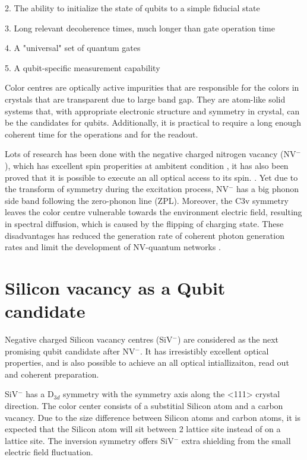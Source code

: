 2. The ability to initialize the state of qubits to a simple fiducial state

3. Long relevant decoherence times, much longer than gate operation time

4. A "universal" set of quantum gates

5. A qubit-specific measurement capability

Color centres are optically active impurities that are responsible for the colors in crystals that are transparent due to large band gap. They are atom-like solid systems that, with appropriate electronic structure and symmetry in crystal, can be the candidates for qubits. Additionally, it is practical to require a long enough coherent time for the operations and for the readout.  

Lots of research has been done with the negative charged nitrogen vacancy (NV$^{-}$), which has excellent spin properities at ambitent condition \citep{childress_atom-like_2014}, it has also been proved that it is possible to execute an all optical access to its spin. \citep{bassett_ultrafast_2014,buckley_spin-light_2010,santori_coherent_2006-1}. Yet due to the transform of symmetry during the excitation process, NV$^{-}$ has a big phonon side band following the zero-phonon line (ZPL). Moreover, the C3v symmetry leaves the color centre vulnerable towards the environment electric field, resulting in spectral diffusion, which is caused by the flipping of charging state. These disadvantages has reduced the generation rate of coherent photon generation rates and limit the development of NV-quantum networks \citep{rogers_all-optical_2014}.

\section[Silicon vacancy as a Qubit candidate]{Silicon vacancy as a Qubit candidate}

Negative charged Silicon vacancy centres (SiV$^{-}$) are considered as the next promising qubit candidate after NV$^{-}$. It has irresistibly excellent optical properties, and is also possible to achieve an all optical intiallizaiton, read out and coherent preparation.

SiV$^{-}$ has a D$_{3d}$ symmetry with the symmetry axis along the <111> crystal direction. The color center consists of a substitial Silicon atom and a carbon vacancy. Due to the size difference between Silicon atoms and carbon atoms, it is expected that the Silicon atom will sit between 2 lattice site instead of on a lattice site\citep{goss_twelve-line_1996, gali_textitab_2013}. The inversion symmetry offers SiV$^{-}$ extra shielding from the small electric field fluctuation.

